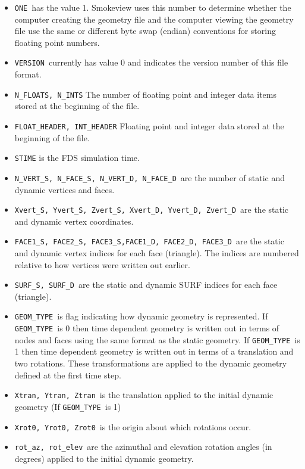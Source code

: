 \documentclass[11pt]{book}
\newcommand{\ct}{\tt\small}
\begin{document}
\begin{itemize}
\item {\ct ONE}\ has the value 1.
Smokeview uses this number to
determine whether the computer creating the geometry file and the
computer viewing the geometry file use the same or different byte
swap (endian) conventions for storing floating point numbers.
\item {\ct VERSION}\ currently has value 0 and indicates the version number of this file format.
\item {\ct N\_FLOATS, N\_INTS} The number of floating point and integer data items stored at
the beginning of the file.
\item {\ct FLOAT\_HEADER, INT\_HEADER} Floating point and integer data stored at
the beginning of the file.
\item {\ct STIME} is the FDS simulation time.
\item {\ct N\_VERT\_S, N\_FACE\_S, N\_VERT\_D, N\_FACE\_D}\ are the number of static and dynamic vertices and faces.
\item {\ct Xvert\_S, Yvert\_S, Zvert\_S, Xvert\_D, Yvert\_D, Zvert\_D}\ are the static and dynamic vertex coordinates.
\item {\ct FACE1\_S, FACE2\_S, FACE3\_S,FACE1\_D, FACE2\_D, FACE3\_D}\ are the static and dynamic vertex
indices for each face (triangle).  The indices are numbered relative to how vertices were written out earlier.
\item {\ct SURF\_S, SURF\_D}\ are the static and dynamic SURF indices for each face (triangle).
\item {\ct GEOM\_TYPE}\ is flag indicating how dynamic geometry is represented.
If {\ct GEOM\_TYPE}\ is 0 then time dependent geometry is written out in
terms of nodes and faces using the same format as the static geometry.
If {\ct GEOM\_TYPE}\ is 1 then time dependent geometry is written out in terms of a translation
and two rotations.  These transformations are applied to the dynamic geometry defined
at the first time step.
\item {\ct Xtran, Ytran, Ztran}\ is the translation applied to the initial dynamic geometry (If {\ct GEOM\_TYPE}\ is 1)
\item {\ct Xrot0, Yrot0, Zrot0}\ is the origin about which rotations occur.
\item {\ct rot\_az, rot\_elev}\ are the azimuthal and elevation rotation angles (in degrees) applied to the initial dynamic geometry.
\end{itemize}
\end{document}
